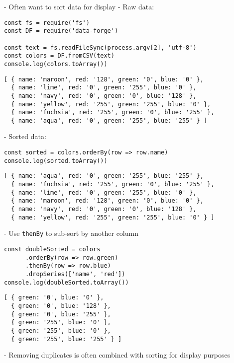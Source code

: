 -   Often want to sort data for display
-   Raw data:

\begin{verbatim}
const fs = require('fs')
const DF = require('data-forge')

const text = fs.readFileSync(process.argv[2], 'utf-8')
const colors = DF.fromCSV(text)
console.log(colors.toArray())
\end{verbatim}

\begin{verbatim}
[ { name: 'maroon', red: '128', green: '0', blue: '0' },
  { name: 'lime', red: '0', green: '255', blue: '0' },
  { name: 'navy', red: '0', green: '0', blue: '128' },
  { name: 'yellow', red: '255', green: '255', blue: '0' },
  { name: 'fuchsia', red: '255', green: '0', blue: '255' },
  { name: 'aqua', red: '0', green: '255', blue: '255' } ]
\end{verbatim}

-   Sorted data:

\begin{verbatim}
const sorted = colors.orderBy(row => row.name)
console.log(sorted.toArray())
\end{verbatim}

\begin{verbatim}
[ { name: 'aqua', red: '0', green: '255', blue: '255' },
  { name: 'fuchsia', red: '255', green: '0', blue: '255' },
  { name: 'lime', red: '0', green: '255', blue: '0' },
  { name: 'maroon', red: '128', green: '0', blue: '0' },
  { name: 'navy', red: '0', green: '0', blue: '128' },
  { name: 'yellow', red: '255', green: '255', blue: '0' } ]
\end{verbatim}

-   Use \texttt{thenBy} to sub-sort by another column

\begin{verbatim}
const doubleSorted = colors
      .orderBy(row => row.green)
      .thenBy(row => row.blue)
      .dropSeries(['name', 'red'])
console.log(doubleSorted.toArray())
\end{verbatim}

\begin{verbatim}
[ { green: '0', blue: '0' },
  { green: '0', blue: '128' },
  { green: '0', blue: '255' },
  { green: '255', blue: '0' },
  { green: '255', blue: '0' },
  { green: '255', blue: '255' } ]
\end{verbatim}

-   Removing duplicates is often combined with sorting for display purposes

